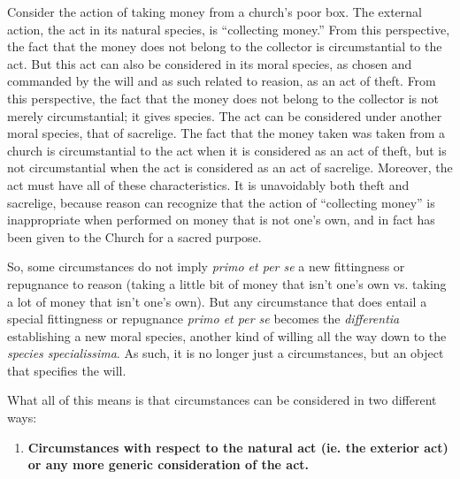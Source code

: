 \documentclass{article}
\begin{document}
Consider the action of taking money from a church's poor box. The external action, the act in its natural species, is
``collecting money.'' From this perspective, the fact that the money does not belong to the collector is circumstantial
to the act. But this act can also be considered in its moral species, as chosen and commanded by the will and as such
related to reasion, as an act of theft. From this perspective, the fact that the money does not belong to the collector
is not merely circumstantial; it gives species. The act can be considered under another moral species, that of
sacrelige. The fact that the money taken was taken from a church is circumstantial to the act when it is considered as
an act of theft, but is not circumstantial when the act is considered as an act of sacrelige. Moreover, the act must
have all of these characteristics. It is unavoidably both theft and sacrelige, because reason can recognize that the
action of ``collecting money'' is inappropriate when performed on money that is not one's own, and in fact has been
given to the Church for a sacred purpose.

So, some circumstances do not imply \emph{primo et per se} a new fittingness or repugnance to reason (taking a little bit of money that
isn't one's own vs. taking a lot of money that isn't one's own). But any circumstance that does entail a special
fittingness or repugnance \emph{primo et per se} becomes the \emph{differentia} establishing a new moral species,
another kind of willing all the way down to the \emph{species specialissima}. As such, it is no longer just a
circumstances, but an object that specifies the will.

What all of this means is that circumstances can be considered in two different ways:

\begin{enumerate}

    \item \textbf{Circumstances with respect to the natural act (ie. the exterior act) or any more generic consideration
        of the act.} 

\end{enumerate}
\end{document}

